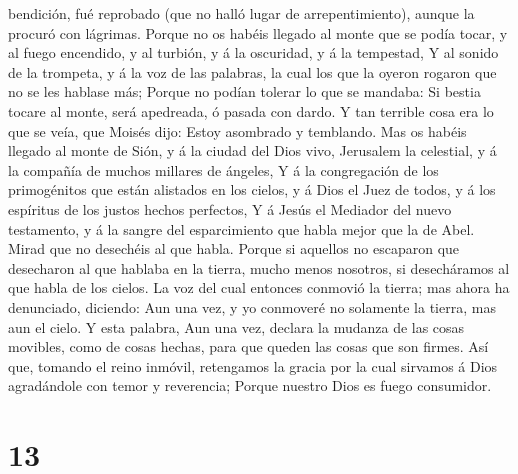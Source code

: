 bendición, fué reprobado (que no halló lugar de arrepentimiento), aunque
la procuró con lágrimas.  Porque no os habéis llegado al
monte que se podía tocar, y al fuego encendido, y al turbión, y á la
oscuridad, y á la tempestad,  Y al sonido de la trompeta, y
á la voz de las palabras, la cual los que la oyeron rogaron que no se
les hablase más;  Porque no podían tolerar lo que se
mandaba: Si bestia tocare al monte, será apedreada, ó pasada con dardo.
 Y tan terrible cosa era lo que se veía, que Moisés dijo:
Estoy asombrado y temblando.  Mas os habéis llegado al
monte de Sión, y á la ciudad del Dios vivo, Jerusalem la celestial, y á
la compañía de muchos millares de ángeles,  Y á la
congregación de los primogénitos que están alistados en los cielos, y á
Dios el Juez de todos, y á los espíritus de los justos hechos perfectos,
 Y á Jesús el Mediador del nuevo testamento, y á la sangre
del esparcimiento que habla mejor que la de Abel.  Mirad
que no desechéis al que habla. Porque si aquellos no escaparon que
desecharon al que hablaba en la tierra, mucho menos nosotros, si
desecháramos al que habla de los cielos.  La voz del cual
entonces conmovió la tierra; mas ahora ha denunciado, diciendo: Aun una
vez, y yo conmoveré no solamente la tierra, mas aun el cielo.
 Y esta palabra, Aun una vez, declara la mudanza de las
cosas movibles, como de cosas hechas, para que queden las cosas que son
firmes.  Así que, tomando el reino inmóvil, retengamos la
gracia por la cual sirvamos á Dios agradándole con temor y reverencia;
 Porque nuestro Dios es fuego consumidor.

\hypertarget{section-12}{%
\section{13}\label{section-12}}

